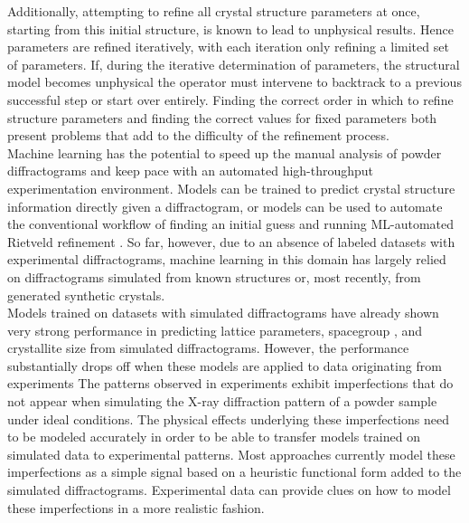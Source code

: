 Additionally, attempting to refine all crystal structure parameters at once, starting from this initial structure, is known to lead to unphysical results\cite{Ozaki2020}. Hence parameters are refined iteratively, with each iteration only refining a limited set of parameters. If, during the iterative determination of parameters, the structural model becomes unphysical the operator must intervene to backtrack to a previous successful step or start over entirely. Finding the correct order in which to refine structure parameters and finding the correct values for fixed parameters both present problems that add to the difficulty of the refinement process.\\

Machine learning has the potential to speed up the manual analysis of powder diffractograms and keep pace with an automated high-throughput experimentation environment\cite{Agrawal2019, Surdu2023}.
Models can be trained to predict crystal structure information directly given a diffractogram, or models can be used to automate the conventional workflow of finding an initial guess \cite{Surdu2023} and running ML-automated Rietveld refinement \cite{Feng2019}.
So far, however, due to an absence of labeled datasets with experimental diffractograms\cite{Wang2020}, machine learning in this domain has largely relied on diffractograms simulated from known structures\cite{Park2017, Lee2023} or, most recently, from generated synthetic crystals\cite{Schopmans2023}. \\

Models trained on datasets with simulated diffractograms have already shown very strong performance in predicting lattice parameters\cite{Dong2021, Chitturi2021, Habershon2004, zhang2024crystallographic}, spacegroup \cite{Schopmans2023, Oviedo2018, Park2017, Vecsei2018, Zaloga2020, Suzuki2020, Chakraborty2021,zhang2024crystallographic}, and crystallite size \cite{Dong2021, Chakraborty2021} from simulated diffractograms.
However, the performance substantially drops off when these models are applied to data originating from experiments \cite{Schopmans2023,zhang2024crystallographic, Wang2020, Vecsei2018} The patterns observed in experiments exhibit imperfections that do not appear when simulating the X-ray diffraction pattern of a powder sample under ideal conditions. The physical effects underlying these imperfections need to be modeled accurately in order to be able to transfer models trained on simulated data to experimental patterns. Most approaches currently model these imperfections as a simple signal based on a heuristic functional form added to the simulated diffractograms. Experimental data can provide clues on how to model these imperfections in a more realistic fashion. \\

